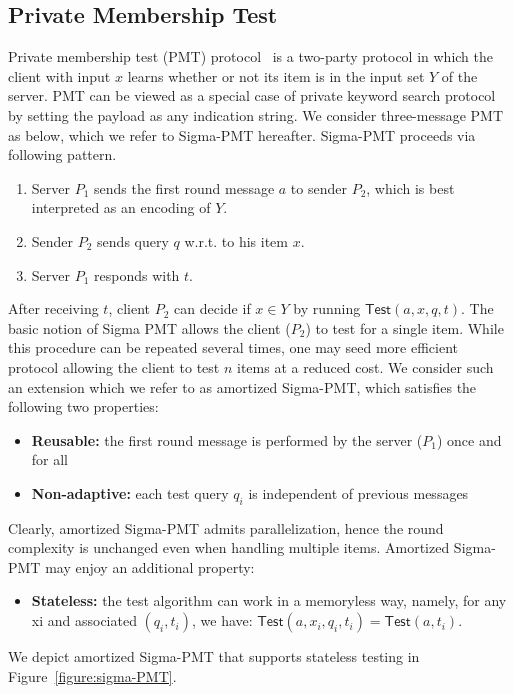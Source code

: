\documentclass[a4paper,10pt]{article}
\begin{document}
\subsection{Private Membership Test}
Private membership test (PMT) protocol~\cite{PSZ-USENIX-2014} is a two-party protocol in which the client with input $x$ 
learns whether or not its item is in the input set $Y$ of the server. 
PMT can be viewed as a special case of private keyword search protocol~\cite{FIPR-TCC-2005} 
by setting the payload as any indication string.
We consider three-message PMT as below, which we refer to Sigma-PMT hereafter. Sigma-PMT proceeds via following pattern.
\begin{enumerate}
\item Server $P_1$ sends the first round message $a$ to sender $P_2$, 
    which is best interpreted as an encoding of $Y$. 
\item Sender $P_2$ sends query $q$ w.r.t. to his item $x$.
\item Server $P_1$ responds with $t$.
\end{enumerate}

After receiving $t$, client $P_2$ can decide if $x \in Y$ by running $\mathsf{Test}(a, x, q, t)$.
The basic notion of Sigma PMT allows the client ($P_2$) to test for a single item. 
While this procedure can be repeated several times, 
one may seed more efficient protocol allowing the client to test $n$ items at a reduced cost. 
We consider such an extension which we refer to as amortized Sigma-PMT, which satisfies the following two properties:

\begin{itemize}
\item \textbf{Reusable:} the first round message is performed by the server ($P_1$) once and for all
\item \textbf{Non-adaptive:} each test query $q_i$ is independent of previous messages
\end{itemize}
Clearly, amortized Sigma-PMT admits parallelization, hence the round complexity is unchanged even when
handling multiple items. Amortized Sigma-PMT may enjoy an additional property:
\begin{itemize}
\item \textbf{Stateless:} the test algorithm can work in a memoryless way, namely, 
    for any xi and associated $(q_i, t_i)$, we have: $\mathsf{Test}(a, x_i, q_i, t_i) = \mathsf{Test}(a, t_i)$.
\end{itemize}
We depict amortized Sigma-PMT that supports stateless testing in Figure~\ref{figure:sigma-PMT}.
\end{document}
